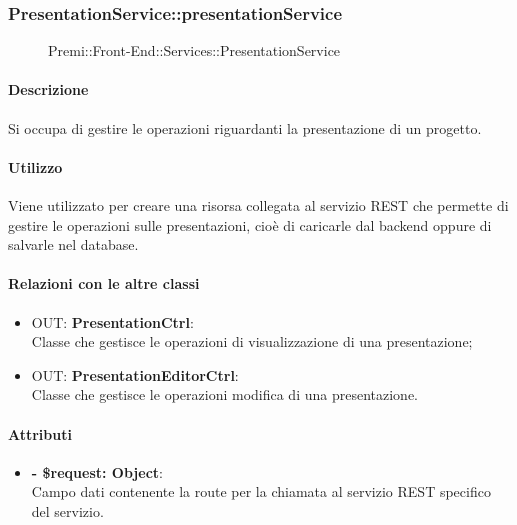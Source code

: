 		\subsubsection{PresentationService::presentationService}
		\begin{figure}[h]
			\centering
			\caption[Premi::Front-End::Services::PresentationService]{Premi::Front-End::Services::PresentationService}
		\end{figure}
		
		\paragraph{Descrizione}
		Si occupa di gestire le operazioni riguardanti la presentazione di un progetto.
		
		\paragraph{Utilizzo}
		Viene utilizzato per creare una risorsa collegata al servizio REST che permette di gestire le operazioni sulle presentazioni, cioè di caricarle dal backend oppure di salvarle nel database.
		
		\paragraph{Relazioni con le altre classi}
		\begin{itemize}
			\item OUT: \textbf{PresentationCtrl}:\\
			Classe che gestisce le operazioni di visualizzazione di una presentazione;
			\item OUT: \textbf{PresentationEditorCtrl}:\\
			Classe che gestisce le operazioni modifica di una presentazione.
		\end{itemize}
		
		\paragraph{Attributi}
		\begin{itemize}
			\item \textbf{- \$request: Object}:\\
			Campo dati contenente la route per la chiamata al servizio REST specifico del servizio.
		\end{itemize}	
		
